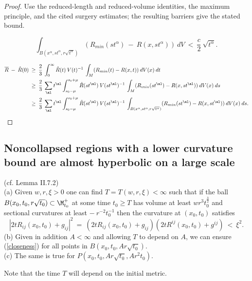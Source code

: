 \begin{proof}
\sketch Use the reduced-length and reduced-volume identities, the maximum principle, and the cited surgery estimates; the resulting barriers give the stated bound.

\begin{equation} \label{poscont}
\int_{B(x^\alpha, {s} t^\alpha, r \sqrt{t^\alpha})}
(R_{min}({s} t^\alpha) \: - \: R(x, {s} t^\alpha)) \:
dV \: < \: \frac{c}{2}
\: \sqrt{t^\alpha}.
\end{equation}

\begin{align} \label{Ralign}
\overline{R} \: - \: \hat{R}(0) \: & \ge \:
\frac23 \: \int_0^\infty \hat{R}(t) \: V(t)^{-1} \:
\int_M (R_{min}(t) - R(x,t)) \: dV(x) \: dt \\
& \ge \:
\frac23 \: \sum_{\al} t^\al
\int_{s_0- \mu}^{s_0 + \mu} \hat{R}(s t^\al) \: V(s t^\al)^{-1} \:
\int_M (R_{min}(s t^\al) - R(x,s t^\al)) \: dV(x) \: ds \notag \\
& \ge \:
\frac23 \: \sum_{\al} t^\al
\int_{s_0- \mu}^{s_0 + \mu} \hat{R}(s t^\al) \: V(s t^\al)^{-1} \:
\int_{B(x^\alpha, {s} t^\alpha, r \sqrt{t^\alpha})}
(R_{min}(s t^\al) - R(x,s t^\al)) \: dV(x) \: ds. \notag
\end{align}
\end{proof}

\subsection{Noncollapsed regions with a lower curvature bound are almost hyperbolic on a large scale}

\begin{lemma}
  \label{lem:kl-noncollapsed-regions-lower-curvature-bound-almost-hyperbolic-large-scale-noncollapsing-lemma}
 \label{lemII.7.2} (cf. Lemma II.7.2) \\
(a) Given $w, r, \xi > 0$ one can find $T = T(w,r,\xi) < \infty$ such that
if the ball $B(x_0, t_0, r \sqrt{t_0}) \subset \M_{t_0}^+$ at some time $t_0 \ge T$ has
volume at least $wr^3 t_0^{\frac32}$ and sectional curvatures at least
$- \: r^{-2} t_0^{-1}$ then the curvature at $(x_0, t_0)$
satisfies
\begin{equation} \label{closeness}
|2tR_{ij}(x_0, t_0) + g_{ij}|^2 \: = \:
(2tR_{ij}(x_0, t_0) + g_{ij})(2tR^{ij}(x_0, t_0) + g^{ij}) \: < \: \xi^2.
\end{equation}
(b) Given in addition $A < \infty$ and allowing $T$ to depend on $A$, we
can ensure (\ref{closeness}) for all points in
$B(x_0, t_0, Ar \sqrt{t_0})$. \\
(c) The same is true for $P(x_0, t_0, Ar \sqrt{t_0}, A r^2 t_0)$.

Note that the time $T$ will depend on the initial metric.
\end{lemma}

